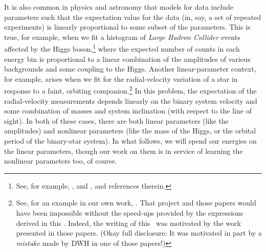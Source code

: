 It is also common in physics and astronomy that models for data
include parameters such that the expectation value for the data (in,
say, a set of repeated experiments) is linearly proportional to some
subset of the parameters.
This is true, for example, when we fit a histogram of \textsl{Large Hadron
  Collider} events affected by the Higgs boson,\footnote{See, for example,
  \cite{atlas}, and \cite{cms}, and references therein.}
where the expected number of counts in each
energy bin is proportional to a linear combination of the amplitudes
of various backgrounds and some coupling to the Higgs.
Another linear-parameter context, for example, arises when we fit for the radial-velocity
variation of a star in response to a faint, orbiting companion.\footnote{See,
  for an example in our own work, \cite{Price-Whelan:2017, Price-Whelan:2020}.
  That project and those papers would have been
  impossible without the speed-ups provided by the expressions derived in this
  \documentname. Indeed, the writing of this \documentname\ was motivated by
  the work presented in those papers. (Okay full disclosure: It was motivated in
  part by a \emph{mistake} made by DWH in one of those papers!)}
In this problem, the expectation of the
radial-velocity measurements depends linearly on the binary system
velocity and some combination of masses and system inclination (with
respect to the line of sight).
In both of these cases, there are both linear parameters (like the
amplitudes) and nonlinear parameters (like the mass of the Higgs, or
the orbital period of the binary-star system).
In what follows, we will spend our energies on the linear parameters,
though our work on them is in service of learning the nonlinear
parameters too, of course.

